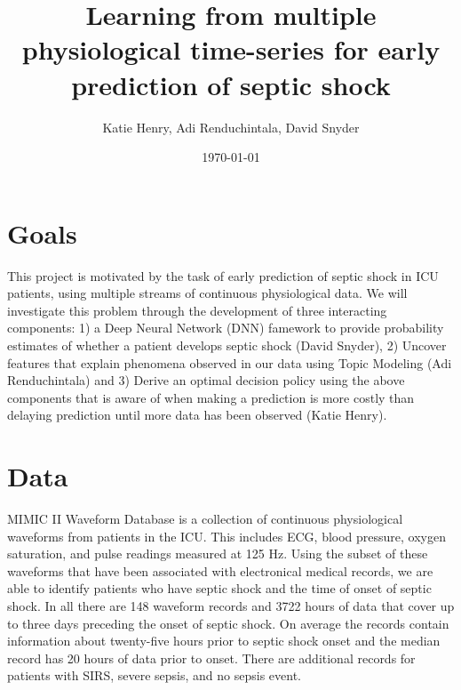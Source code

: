 \documentclass[dvips,12pt]{article}
\begin{document}

\title{Learning from multiple physiological time-series for early prediction of septic shock}
\author{Katie Henry, Adi Renduchintala, David Snyder}
\date{\today}



\maketitle


\section{Goals}
This project is motivated by the task of early prediction of septic shock in ICU patients, using multiple streams of continuous physiological data. 
We will investigate this problem through the development of three interacting components:
1) a Deep Neural Network (DNN) famework to provide probability estimates of whether a patient develops septic shock (David Snyder),
2) Uncover features that explain phenomena observed in our data using Topic Modeling (Adi Renduchintala) and
3) Derive an optimal decision policy using the above components that is aware of when making a prediction is more costly than delaying prediction until more data has been observed (Katie Henry).


\section{Data}
MIMIC II Waveform Database is a collection of continuous physiological waveforms from patients in the ICU. This includes ECG, blood pressure, oxygen saturation, and pulse readings measured at 125 Hz. Using the subset of these waveforms that have been associated with electronical medical records, we are able to identify patients who have septic shock and the time of onset of septic shock. In all there are 148 waveform records and 3722 hours of data that cover up to three days preceding the onset of septic shock. On average the records contain information about twenty-five hours prior to septic shock onset and the median record has 20 hours of data prior to onset. There are additional records for patients with SIRS, severe sepsis, and no sepsis event.
\end{document}
